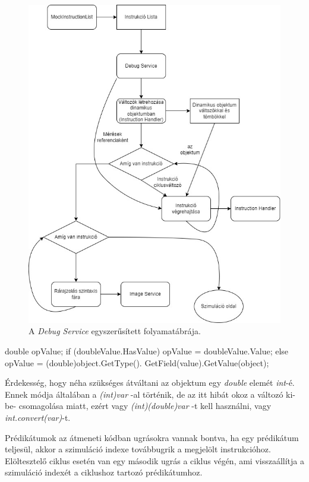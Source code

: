 \begin{figure}[h]
\centering
\includegraphics[scale=0.65]{images/SimpleDebug.jpg}
\caption{A \textit{Debug Service} egyszerűsített folyamatábrája.}
\label{fig:debugflow}
\end{figure}

\begin{cpp}
double opValue;
if (doubleValue.HasValue)
{
    opValue = doubleValue.Value;
}
else
{
     opValue = (double)object.GetType().
     GetField(value).GetValue(object);
}
\end{cpp}

Érdekesség, hogy néha szükséges átváltani az objektum egy \textit{double} elemét \textit{int}-é. Ennek módja általában a \textit{(int)var} -al történik, de az itt hibát okoz a változó ki-be- csomagolása miatt, ezért vagy \textit{(int)(double)var} -t kell használni, vagy \textit{int.convert(var)}-t.

Prédikátumok az átmeneti kódban ugrásokra vannak bontva, ha egy prédikátum teljesül, akkor a szimuláció indexe továbbugrik a megjelölt instrukcióhoz. Elöltesztelő ciklus esetén van egy második ugrás a ciklus végén, ami visszaállítja a szimuláció indexét a ciklushoz tartozó prédikátumhoz.

